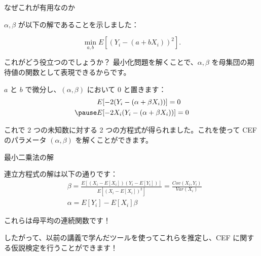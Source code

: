 \documentclass[11pt,handout]{beamer}
\newenvironment{wideitemize}{\itemize\addtolength{\itemsep}{10pt}}{\enditemize}
\begin{document}
\begin{frame}{なぜこれが有用なのか}
\begin{wideitemize}

\item
$\alpha,\beta$ が以下の解であることを示しました：

$$\min_{a,b}E[ (Y_i -  (a+ b X_i)  )^2  ] .$$

\item 
これがどう役立つのでしょうか？ \pause 最小化問題を解くことで、$\alpha,\beta$ を母集団の期待値の関数として表現できるからです。

\pause
\item
$a$ と $b$ で微分し、$(\alpha,\beta)$ において 0 と置きます： \pause
\begin{align*}
& E[-2  (Y_i - (\alpha + \beta X_i )) ] = 0 \\ \pause
& E[-2  X_i (Y_i -(\alpha + \beta X_i)) ] = 0
\end{align*}

\pause
\item
これで 2 つの未知数に対する 2 つの方程式が得られました。これを使って CEF のパラメータ $(\alpha,\beta)$ を解くことができます。

\end{wideitemize}
\end{frame}

\begin{frame}{最小二乗法の解}
\begin{wideitemize}
\item
連立方程式の解は以下の通りです：
\begin{align*}
& \beta = \frac{E[ (X_i -E[X_i]) (Y_i - E[Y_i])  ]}{E[ (X_i - E[X_i])^2 ]} = \frac{Cov(X_i, Y_i)}{Var(X_i)} \\ 
& \alpha = E[Y_i] - E[X_i] \beta
\end{align*}

\pause
\item
これらは母平均の連続関数です！

\pause
\item
したがって、以前の講義で学んだツールを使ってこれらを推定し、CEF に関する仮説検定を行うことができます！
\end{wideitemize}	
\end{frame}
\end{document}
